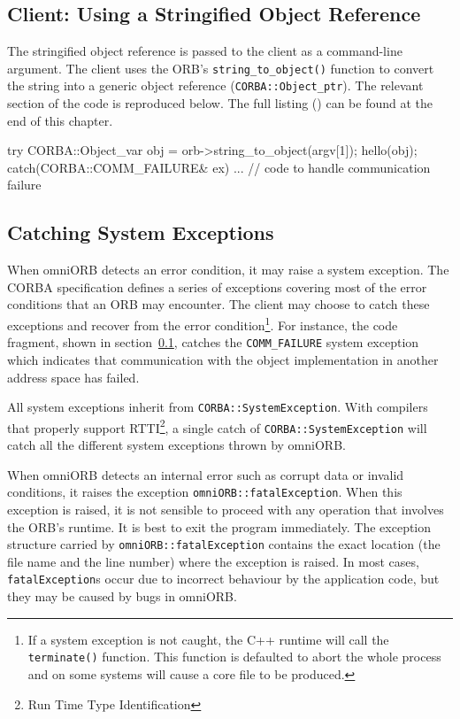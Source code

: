 \documentclass[11pt,twoside,a4paper]{book}
\newcommand{\type}[1]{\texttt{#1}}
\newcommand{\code}[1]{\texttt{#1}}
\newcommand{\op}[1]{\texttt{#1()}}
\newcommand{\file}{\begingroup \urlstyle{tt}\Url}
\begin{document}
\subsection{Client: Using a Stringified Object Reference}
\label{clnt2}

The stringified object reference is passed to the client as a
command-line argument. The client uses the ORB's
\op{string\_to\_object} function to convert the string into a generic
object reference (\type{CORBA::Object\_ptr}). The relevant section of
the code is reproduced below. The full listing (\file{eg2_clt.cc}) can
be found at the end of this chapter.

\begin{cxxlisting}
try {
  CORBA::Object_var obj = orb->string_to_object(argv[1]);
  hello(obj);
}
catch(CORBA::COMM_FAILURE& ex) {
  ... // code to handle communication failure
}
\end{cxxlisting}


\subsection{Catching System Exceptions}

When omniORB detects an error condition, it may raise a system
exception.  The CORBA specification defines a series of exceptions
covering most of the error conditions that an ORB may encounter. The
client may choose to catch these exceptions and recover from the error
condition\footnote{If a system exception is not caught, the C++
runtime will call the \op{terminate} function. This function is
defaulted to abort the whole process and on some systems will cause a
core file to be produced.}. For instance, the code fragment, shown in
section~\ref{clnt2}, catches the \code{COMM\_FAILURE} system exception
which indicates that communication with the object implementation in
another address space has failed.

All system exceptions inherit from \type{CORBA::SystemException}. With
compilers that properly support RTTI\footnote{Run Time Type
Identification}, a single catch of \code{CORBA::SystemException} will
catch all the different system exceptions thrown by omniORB.

When omniORB detects an internal error such as corrupt data or invalid
conditions, it raises the exception \type{omniORB::fatalException}.
When this exception is raised, it is not sensible to proceed with any
operation that involves the ORB's runtime. It is best to exit the
program immediately. The exception structure carried by
\type{omniORB::fatalException} contains the exact location (the file
name and the line number) where the exception is raised. In most
cases, \type{fatalException}s occur due to incorrect behaviour by the
application code, but they may be caused by bugs in omniORB.
\end{document}
